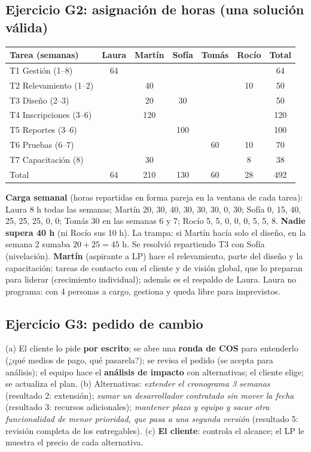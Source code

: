 \documentclass[11pt,a4paper]{article}
\begin{document}
\subsection*{Ejercicio G2: asignación de horas (una solución válida)}
\begin{center}\small
\begin{tabular}{l*{5}{c}c}
\toprule
Tarea (semanas) & Laura & Martín & Sofía & Tomás & Rocío & Total\\
\midrule
T1 Gestión (1--8) & 64 & & & & & 64\\
T2 Relevamiento (1--2) & & 40 & & & 10 & 50\\
T3 Diseño (2--3) & & 20 & 30 & & & 50\\
T4 Inscripciones (3--6) & & 120 & & & & 120\\
T5 Reportes (3--6) & & & 100 & & & 100\\
T6 Pruebas (6--7) & & & & 60 & 10 & 70\\
T7 Capacitación (8) & & 30 & & & 8 & 38\\
\midrule
Total & 64 & 210 & 130 & 60 & 28 & 492\\
\bottomrule
\end{tabular}
\end{center}
\textbf{Carga semanal} (horas repartidas en forma pareja en la ventana de cada tarea): Laura 8 h todas las semanas;
Martín 20, 30, 40, 30, 30, 30, 0, 30; Sofía 0, 15, 40, 25, 25, 25, 0, 0; Tomás 30 en las semanas 6 y 7; Rocío 5,
5, 0, 0, 0, 5, 5, 8. \textbf{Nadie supera 40 h} (ni Rocío sus 10 h). La trampa: si Martín hacía solo el diseño, en
la semana 2 sumaba $20 + 25 = 45$ h. Se resolvió repartiendo T3 con Sofía (nivelación).
\textbf{Martín} (aspirante a LP) hace el relevamiento, parte del diseño y la capacitación: tareas de contacto con
el cliente y de visión global, que lo preparan para liderar (crecimiento individual); además es el respaldo de
Laura. Laura no programa: con 4 personas a cargo, gestiona y queda libre para imprevistos.

\subsection*{Ejercicio G3: pedido de cambio}
(a) El cliente lo pide \textbf{por escrito}; se abre una \textbf{ronda de COS} para entenderlo (¿qué medios de pago,
qué pasarela?); se revisa el pedido (se acepta para análisis); el equipo hace el \textbf{análisis de impacto} con
alternativas; el cliente elige; se actualiza el plan. (b) Alternativas: \emph{extender el cronograma 3 semanas}
(resultado 2: extensión); \emph{sumar un desarrollador contratado sin mover la fecha} (resultado 3: recursos
adicionales); \emph{mantener plazo y equipo y sacar otra funcionalidad de menor prioridad, que pasa a una segunda
versión} (resultado 5: revisión completa de los entregables). (c) \textbf{El cliente}: controla el alcance; el LP
le muestra el precio de cada alternativa.
\end{document}
